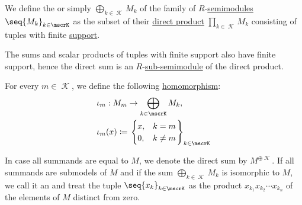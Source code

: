 \begin{definition}\label{def:semimodule_direct_sum}\mimprovised
  We define the  or simply  \( \bigoplus_{k \in \mscrK} M_k \) of the family of \( R \)-\hyperref[def:semimodule]{semimodules} \( \seq{ M_k }_{k \in \mscrK} \) as the subset of their \hyperref[def:first_order_direct_product]{direct product} \( \prod_{k \in \mscrK} M_k \) consisting of tuples with finite \hyperref[def:function_support]{support}.

  The sums and scalar products of tuples with finite support also have finite support, hence the direct sum is an \( R \)-\hyperref[def:semimodule/submodel]{sub-semimodule} of the direct product.

  \begin{thmenum}
     For every \( m \in \mscrK \), we define the following  \hyperref[def:semimodule/homomorphism]{homomorphism}:
    \begin{equation*}
      \begin{aligned}
        &\iota_m: M_m \to \bigoplus_{k \in \mscrK} M_k, \\
        &\iota_m(x) \coloneqq \begin{rcases}
          \begin{cases}
            x, &k = m \\
            0, &k \neq m
          \end{cases}
        \end{rcases}_{k \in \mscrK}
      \end{aligned}
    \end{equation*}

     In case all summands are equal to \( M \), we denote the direct sum by \( M^{\oplus \mscrK} \).
     If all summands are submodels of \( M \) and if the sum \( \bigoplus_{k \in \mscrK} M_k \) is isomorphic to \( M \), we call it an  and treat the tuple \( \seq{ x_k }_{k \in \mscrK} \) as the product \( x_{k_1} x_{k_2} \cdots x_{k_n} \) of the elements of \( M \) distinct from zero.
  \end{thmenum}
\end{definition}

